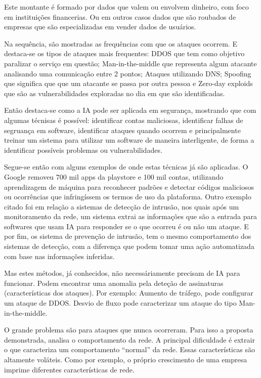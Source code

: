 Este montante é formado por dados que valem ou envolvem dinheiro, com foco em instituições financerias. Ou em outros casos dados que são roubados de empresas que são especializadas em vender dados de usuários.

Na sequência, são mostradas as frequências com que os ataques ocorrem. E destaca-se os tipos de ataques mais frequentes: DDOS que tem como objetivo paralizar o serviço em questão; Man-in-the-middle que representa algum atacante analisando uma comunicação entre 2 pontos; Ataques utilizando DNS; Spoofing que significa que que um atacante se passa por outra pessoa e Zero-day exploids que são as vulnerabilidades exploradas no dia em que são identificadas.

Então destaca-se como a IA pode ser aplicada em segurança, mostrando que com algumas técnisas é possível: identificar contas maliciosas, identificar falhas de segruança em software, identificar ataques quando ocorrem e principalmente treinar um sistema para utilizar um software de maneira interligente, de forma a identificar possíveis problemas ou vulnerabilidades.

Segue-se então com alguns exemplos de onde estas técnicas já são aplicadas. O Google removeu 700 mil apps da playstore e 100 mil contas, utilizando aprendizagem de máquina para reconhecer padrões e detectar códigos maliciosos ou ocorrências que infringíssem os termos de uso da plataforma. Outro exemplo citado foi em relação a sistemas de detecção de intrusão, nos quais após um monitoramento da rede, um sistema extrai as informações que são a entrada para softwares que usam IA para responder se o que ocorreu é ou não um ataque. E por fim, os sistema de prevenção de intrusão, tem o mesmo comportamento dos sistemas de detecção, com a diferença que podem tomar uma ação automatizada com base nas informações inferidas.

Mas estes métodos, já conhecidos, não necessáriamente precisam de IA para funcionar. Podem encontrar uma anomalia pela deteção de assinaturas (características dos ataques). Por exemplo: Aumento de tráfego, pode configurar um ataque de DDOS. Desvio de fluxo pode caracterizar um ataque do tipo Man-in-the-middle.

O grande problema são para ataques que nunca ocorreram. Para isso a proposta demonstrada, analisa o comportamento da rede. A principal dificuldade é extrair o que caracteriza um comportamento ``normal'' da rede. Essas características são altamente voláteis. Como por exemplo, o próprio crescimento de uma empresa imprime diferentes características de rede.

